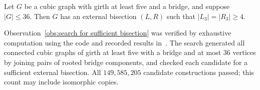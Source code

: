 \begin{observation}\label{obs:search for sufficient bisection}
    Let $G$ be a cubic graph with girth at least five and a bridge,
    and suppose $|G|\leq 36$. Then $G$ has an external bisection
    $(L,R)$ such that $|L_3|=|R_3|\geq 4$.
\end{observation}

Observation~\ref{obs:search for sufficient bisection} was verified by
exhaustive computation using the code and recorded results
in~\cite{hausmann-bisection-search}.
The search generated all connected cubic graphs of girth at least five
with a bridge and at most $36$ vertices by joining pairs of rooted
bridge components, and checked each candidate for a sufficient external
bisection. All $149{,}585{,}205$ candidate constructions passed; this
count may include isomorphic copies.
